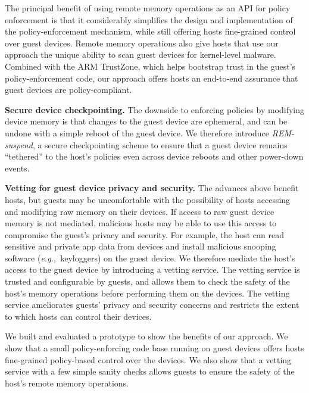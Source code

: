 \documentclass[pageno]{sig-alternate-05-2015}
\newcommand{\emphitem}[1]{\textbf{#1}}
\newcommand*\circled[1]{\tikz[baseline=(char.base)]{
            \node[shape=circle,draw,inner sep=0.5pt] (char) {#1};}}
\newcounter{myctr}
\newenvironment{mylist}{\begin{list}{\textbf{\circled{\arabic{myctr}}}}
{\usecounter{myctr}
\setlength{\topsep}{1mm}\setlength{\itemsep}{0.5mm}
\setlength{\parsep}{0.5mm}
\setlength{\listparindent}{\parindent} %
\setlength{\itemindent}{0mm}\setlength{\partopsep}{0mm}
\setlength{\labelwidth}{-2mm}
\setlength{\leftmargin}{0mm}}}{\end{list}}
\newcommand{\eg}{\textit{e.g.,}}
\begin{document}
\begin{mylist}
The principal benefit of using remote memory operations as an API for policy
enforcement is that it considerably simplifies the design and implementation of
the policy-enforcement mechanism, while still offering hosts fine-grained
control over guest devices.  Remote memory operations also give hosts that use
our approach the unique ability to scan guest devices for kernel-level malware.
Combined with the ARM TrustZone, which helps bootstrap trust in the guest's
policy-enforcement code, our approach offers hosts an end-to-end assurance that
guest devices are policy-compliant.
%
\item \emphitem{Secure device checkpointing.} The downside to enforcing
policies by modifying device memory is that changes to the guest device are
ephemeral, and can be undone with a simple reboot of the guest device. We
therefore introduce \textit{REM-suspend}, a secure checkpointing scheme to
ensure that a guest device remains ``tethered'' to the host's policies even
across device reboots and other power-down events.
%
\item \emphitem{Vetting for guest device privacy and security.} The advances
above benefit hosts, but guests may be uncomfortable with the possibility of
hosts accessing and modifying raw memory on their devices. If access to raw
guest device memory is not mediated, malicious hosts may be able to use this
access to compromise the guest's privacy and security. For example, the host
can read sensitive and private app data from devices and install malicious
snooping software (\eg~keyloggers) on the guest device.  We therefore mediate
the host's access to the guest device by introducing a vetting service. The
vetting service is trusted and configurable by guests, and allows them to check
the safety of the host's memory operations before performing them on the
devices.  The vetting service ameliorates guests' privacy and security concerns
and restricts the extent to which hosts can control their devices.
%
\end{mylist}

We built and evaluated a prototype to show the benefits of our approach. We
show that a small policy-enforcing code base running on guest devices offers
hosts fine-grained policy-based control over the devices. We also show that a
vetting service with a few simple sanity checks allows guests to ensure the
safety of the host's remote memory operations.


% 
\end{document}
